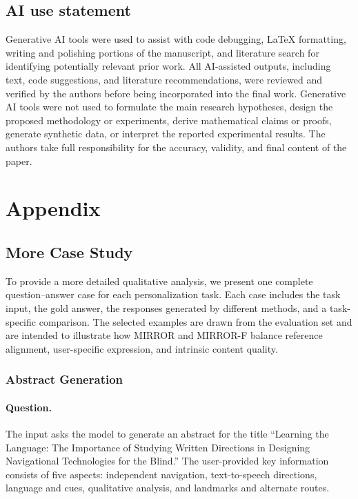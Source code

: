 \documentclass{article} %
\begin{document}
\subsection*{AI use statement}
Generative AI tools were used to assist with code debugging, LaTeX formatting, writing and polishing portions of the manuscript, and literature search for identifying potentially relevant prior work. All AI-assisted outputs, including text, code suggestions, and literature recommendations, were reviewed and verified by the authors before being incorporated into the final work. Generative AI tools were not used to formulate the main research hypotheses, design the proposed methodology or experiments, derive mathematical claims or proofs, generate synthetic data, or interpret the reported experimental results. The authors take full responsibility for the accuracy, validity, and final content of the paper.




\appendix
\section{Appendix}
\subsection{More Case Study}
\label{app:more_case_study}

To provide a more detailed qualitative analysis, we present one complete question--answer case for each personalization task. Each case includes the task input, the gold answer, the responses generated by different methods, and a task-specific comparison. The selected examples are drawn from the evaluation set and are intended to illustrate how MIRROR and MIRROR-F balance reference alignment, user-specific expression, and intrinsic content quality.

\subsubsection{Abstract Generation}

\paragraph{Question.}
The input asks the model to generate an abstract for the title ``Learning the Language: The Importance of Studying Written Directions in Designing Navigational Technologies for the Blind.'' The user-provided key information consists of five aspects: independent navigation, text-to-speech directions, language and cues, qualitative analysis, and landmarks and alternate routes.
\end{document}
